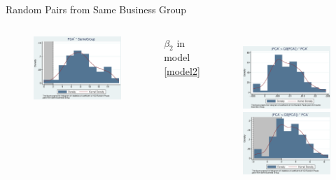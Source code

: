 \documentclass{beamer}
\begin{document}
\begin{frame}{Random Pairs from Same Business Group}
\begin{columns}
\begin{figure}
				\includegraphics[width=\linewidth]{BusinessPseudoSBFCA_t.eps}
			\end{figure}
			\begin{center}
				$ \beta_2 $ in model \ref{model2}
			\end{center}
			\begin{figure}
				\centering
				\includegraphics[width=\linewidth]{BusinessPseudoMNMFCA.eps}\\
				\includegraphics[width=\linewidth]{BusinessPseudoMNMFCA_t.eps}

\end{figure}
\end{columns}
\end{frame}
\end{document}
